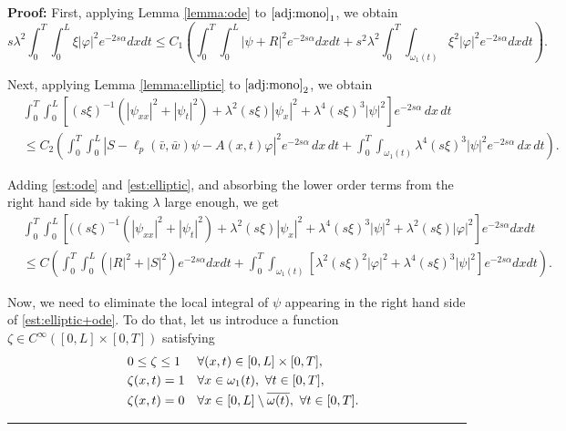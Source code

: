 \documentclass[10pt]{article}
\newenvironment{proof}[1][Proof]
{\noindent\textbf{#1:} }{\hfill\rule{0.5em}{0.5em}}
\def\dis{\displaystyle}
\def\om{\omega}
\def\\Phivec{\mathbf{\Phi}}
\newcommand{\iiTL}{\int_0^T\!\!\!\!\int_0^L }
\newcommand{\be}{\begin{equation}}
\newcommand{\ee}{\end{equation}}
\begin{document}
\begin{proof}
	First, applying Lemma \ref{lemma:ode} to $\eqref{adj:mono}_1$, we obtain
\be  \label{est:ode}
	\!\!\!s \lambda ^2 \iiTL\!\!\!\xi  |  \varphi |^2 e^{-2s\alpha}dxdt \le C_1
	\left(\iiTL\!\!\!|\psi +R|^2 e^{-2s\alpha} dxdt
	+s^2 \lambda ^2 \int_0^T\!\!\!\int_{\om_1(t)}\!\!\!\xi ^2  |\varphi|^2e^{-2s\alpha} dxdt\right)\!.
\ee
	
	Next, applying Lemma \ref{lemma:elliptic} to $\eqref{adj:mono}_2$, we obtain
\begin{equation}\label{est:elliptic}
\begin{alignedat}{2}
	&\iiTL[(s\xi)^{-1}(|\psi_{xx}|^2+|\psi_t|^2)+\lambda^2(s\xi)|\psi_x|^2+\lambda ^4(s\xi)^3|\psi|^2]
	e^{-2s\alpha}\,dx\,dt\\
	&\le C_2 \left(\iiTL|  S-\ell_p(\bar v,\bar w)\psi-A(x,t)\varphi|^2 e^{-2s \alpha}\,dx\,dt
	+\int_0^T\!\!\!\int_{\om_1(t)}
	\lambda ^4(s\xi)^3|\psi|^2e^{-2s\alpha}\,dx\,dt\right). 	
\end{alignedat}
\end{equation}

Adding \eqref{est:ode} and  \eqref{est:elliptic}, and absorbing the lower order terms from the right hand side by taking $\lambda$ large enough,  we get
\begin{equation}\label{est:elliptic+ode}
\begin{alignedat}{2}
	&\iiTL[((s\xi)^{-1}(|\psi_{xx}|^2+|\psi_t|^2)+\lambda^2(s\xi)|\psi_x|^2+\lambda ^4(s\xi)^3|\psi|^2+\lambda ^2 (s\xi)   |\varphi |^2 ]e^{-2s\alpha}dxdt\\
		&\le C \left(\iiTL\!(|R|^2+|S|^2) e^{-2s\alpha} dxdt +
		\int_0^T \!\!\! \int_{\om_1(t)}[\lambda ^2(s\xi)^2 |\varphi|^2 + \lambda ^4 (s\xi)^3 |\psi|^2] e^{-2s\alpha} dxdt \right).
	\end{alignedat}
\end{equation}

	Now, we need to eliminate the local integral of $\psi$ appearing in the right hand side of \eqref{est:elliptic+ode}.
	To do that, let us introduce a function $\zeta \in C^\infty([0,L]\times[0,T])$ satisfying
\begin{equation}\label{zeta}
	\begin{array}{lll}
	&0\le \zeta\le 1&\forall (x,t)\in [0,L]\times[0,T],\\
	\noalign{\smallskip}\dis
	&\zeta(x,t) =1&\forall x\in\om_1(t),~\forall t\in[0,T],\\
	\noalign{\smallskip}\dis
	&\zeta(x,t) =0& \forall x\in [0,L]\setminus \overline{\om(t)},~ \forall t\in[0,T].
	\end{array}
\end{equation}



\end{proof}
\end{document}
